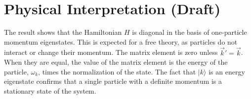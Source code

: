 \documentclass[11pt, a4paper]{article}
\begin{document}
\section*{Physical Interpretation (Draft)}

The result shows that the Hamiltonian $H$ is diagonal in the basis of one-particle momentum eigenstates. This is expected for a free theory, as particles do not interact or change their momentum. The matrix element is zero unless $\vec{k}' = \vec{k}$. When they are equal, the value of the matrix element is the energy of the particle, $\omega_k$, times the normalization of the state. The fact that $|k\rangle$ is an energy eigenstate confirms that a single particle with a definite momentum is a stationary state of the system.
\end{document}
